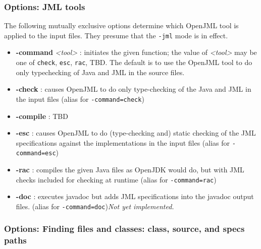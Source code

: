 \subsubsection{Options: JML tools}
\label{OptionsTools}
The following mutually exclusive options determine which OpenJML tool is applied to the input files. They presume that the \texttt{-jml} mode is in effect.
\begin{itemize}
\item \textbf{-command} {\it <tool>} : initiates the given function; the value of {\it <tool>} may be one of {\tt check}, {\tt esc}, {\tt rac}, TBD.
The default is to use the OpenJML tool to do only typechecking of Java and JML in the source files.
\item \textbf{-check} : causes OpenJML to do only type-checking of the Java and JML in the input files (alias for \texttt{-command=check})
\item \textbf{-compile} : TBD
\item \textbf{-esc} : causes OpenJML to do (type-checking and) static checking of the JML specifications against the implementations in the input files  (alias for \texttt{-command=esc})
\item \textbf{-rac} : compiles the given Java files as OpenJDK would do, but with JML checks included for checking at runtime  (alias for \texttt{-command=rac})
\item \textbf{-doc} : executes javadoc but adds JML specifications into the javadoc output files.  (alias for \texttt{-command=doc})\textit{Not yet implemented.} 
\end{itemize}


\subsubsection{Options: Finding files and classes: class, source, and specs paths}
\label{OptionsPaths}

